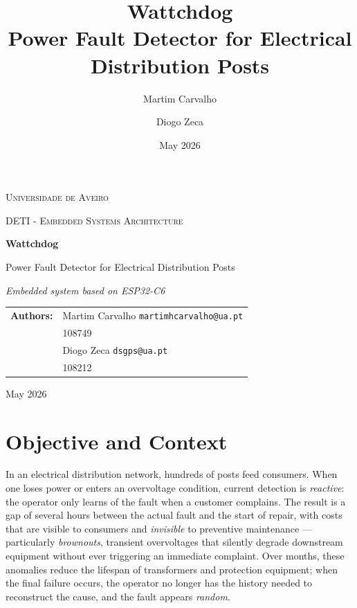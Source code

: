 \documentclass[10pt,a4paper]{article}
\title{Wattchdog\\\large Power Fault Detector for Electrical Distribution Posts}
\author{Martim Carvalho \and Diogo Zeca}
\date{May 2026}
\begin{document}
\begin{titlepage}
  \centering
  \vspace*{2cm}
  {\scshape\Large Universidade de Aveiro\par}
  {\scshape DETI - Embedded Systems Architecture\par}
  \vfill
  {\Huge\bfseries Wattchdog\par}
  \vspace{0.5cm}
  {\Large Power Fault Detector for Electrical Distribution Posts\par}
  \vspace{0.4cm}
  {\itshape Embedded system based on ESP32-C6\par}
  \vfill
  \begin{tabular}{rl}
    \textbf{Authors:} & Martim Carvalho \quad \texttt{martimhcarvalho@ua.pt} \\
                      & 108749 \\[2pt]
                      & Diogo Zeca \quad \texttt{dsgps@ua.pt} \\
                      & 108212 \\
  \end{tabular}
  \vfill
  {\large May 2026\par}
\end{titlepage}

\section{Objective and Context}

In an electrical distribution network, hundreds of posts feed consumers.
When one loses power or enters an overvoltage condition, current detection is
\emph{reactive}: the operator only learns of the fault when a customer complains.
The result is a gap of several hours between the actual fault and the start of
repair, with costs that are visible to consumers and \emph{invisible} to preventive
maintenance --- particularly \emph{brownouts}, transient overvoltages that silently
degrade downstream equipment without ever triggering an immediate complaint. Over
months, these anomalies reduce the lifespan of transformers and protection equipment;
when the final failure occurs, the operator no longer has the history needed to
reconstruct the cause, and the fault appears \emph{random}.
\end{document}
